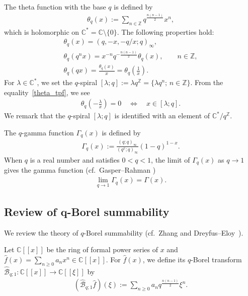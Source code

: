 \documentclass[11pt]{article}
\numberwithin{equation}{section}
\begin{document}
The theta function with the base $q$ is defined by
\begin{gather*}
\theta_q(x):=\sum_{n\in\mathbb{Z}}q^{\frac{n(n-1)}{2}}x^n,
\end{gather*}
which is holomorphic on $\mathbb{C}^*=\mathbb{C}\setminus\{0\}$. The following properties hold:
\begin{gather}
\theta_q(x) =(q,-x,-q/x;q)_\infty,\label{theta_tpf}\\
\theta_q(q^nx) =x^{-n}q^{-\frac{n(n-1)}{2}}\theta_q(x),\qquad n\in\mathbb{Z},\label{theta_q-diff}\\
\theta_q(qx) =\frac{\theta_q(x)}{x}=\theta_q\left(\frac{1}{x}\right)\label{theta_inverse}.
\end{gather}
For $\lambda\in\mathbb{C}^*$, we set the $q$-spiral $[\lambda;q]:=\lambda q^\mathbb{Z}=\{\lambda q^n ;\,n\in\mathbb{Z}\}$. From the equality~\eqref{theta_tpf}, we see
\begin{gather*}
\theta_q\left(-\frac{\lambda}{x}\right)=0\quad \Leftrightarrow \quad x\in[\lambda;q].
\end{gather*}
We remark that the $q$-spiral $[\lambda;q]$ is identified with an element of $\mathbb{C}^*/q^\mathbb{Z}$.

The $q$-gamma function $\Gamma_q(x)$ is defined by
\begin{gather*}
\Gamma_q(x):=\frac{(q;q)_\infty}{(q^x;q)_\infty}(1-q)^{1-x}.
\end{gather*}
When $q$ is a real number and satisfies $0<q<1$, the limit of $\Gamma_q(x)$ as $q\to1$ gives the gamma function (cf.\ Gasper--Rahman {\cite[Section~1.10]{Gasper&Rahman2004}})
\begin{gather}\label{qgamma_reduction}
\lim_{q\to1}\Gamma_q(x)=\Gamma(x).
\end{gather}

\subsection[Review of $q$-Borel summability]{Review of $\boldsymbol{q}$-Borel summability}\label{Review}
We review the theory of $q$-Borel summability (cf.~Zhang \cite{Zhang2002, Zhang2005} and Dreyfus--Eloy~\cite{DreyfusEloy2016}).

Let $\mathbb{C}[[x]]$ be the ring of formal power series of $x$ and $\hat{f}(x)=\sum\limits_{n\ge0}a_nx^n\in\mathbb{C}[[x]]$. For $\hat{f}(x)$, we define its $q$-Borel transform $\hat{\mathcal{B}}_{q;1}\colon \mathbb{C}[[x]]\to\mathbb{C}[[\xi]]$ by
\begin{gather*}
(\hat{\mathcal{B}}_{q;1}\hat{f})(\xi):=\sum_{n\ge0}a_nq^{\frac{n(n-1)}{2}}\xi^n.
\end{gather*}
\end{document}
